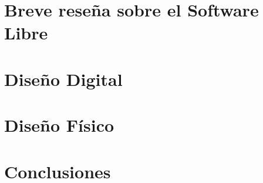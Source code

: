 \documentclass[twoside,12pt, pdftex]{classes/CUEDthesisPSnPDF}
\begin{document}
\sloppy

\maketitle
%

\tableofcontents			%
\listoffigures 
\listoftables 

\mainmatter
\part{Breve reseña sobre el Software Libre}
\part{Diseño Digital}


\part{Diseño Físico}


\part{Conclusiones}

\appendix


%
\backmatter


\pagestyle{fancyplain}                                                            %
\renewcommand{\partname}{PARTE}
\renewcommand{\chaptermark}[1]{\markboth{\textbf{\small{CAPÍTULO \thechapter}}}{}}%
\renewcommand{\sectionmark}[1]{\markright{\textbf{\small{\thesection. #1}}}}      %





\end{document}
